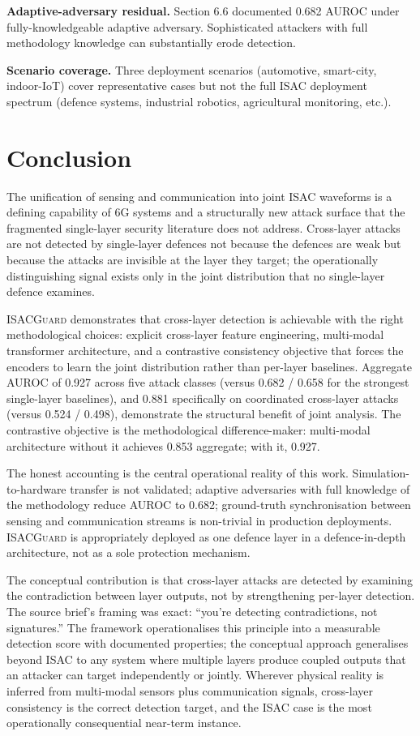 \documentclass[sigconf,nonacm]{acmart}
\begin{document}
\textbf{Adaptive-adversary residual.} Section 6.6 documented
0.682 AUROC under fully-knowledgeable adaptive adversary.
Sophisticated attackers with full methodology knowledge can
substantially erode detection.

\textbf{Scenario coverage.} Three deployment scenarios (automotive,
smart-city, indoor-IoT) cover representative cases but not the
full ISAC deployment spectrum (defence systems, industrial
robotics, agricultural monitoring, etc.).

\section{Conclusion}

The unification of sensing and communication into joint ISAC
waveforms is a defining capability of 6G systems and a
structurally new attack surface that the fragmented
single-layer security literature does not address. Cross-layer
attacks are not detected by single-layer defences not because
the defences are weak but because the attacks are invisible at
the layer they target; the operationally distinguishing signal
exists only in the joint distribution that no single-layer
defence examines.

\textsc{ISACGuard} demonstrates that cross-layer detection is
achievable with the right methodological choices: explicit
cross-layer feature engineering, multi-modal transformer
architecture, and a contrastive consistency objective that
forces the encoders to learn the joint distribution rather than
per-layer baselines. Aggregate AUROC of 0.927 across five attack
classes (versus 0.682 / 0.658 for the strongest single-layer
baselines), and 0.881 specifically on coordinated cross-layer
attacks (versus 0.524 / 0.498), demonstrate the structural
benefit of joint analysis. The contrastive objective is the
methodological difference-maker: multi-modal architecture
without it achieves 0.853 aggregate; with it, 0.927.

The honest accounting is the central operational reality of
this work. Simulation-to-hardware transfer is not validated;
adaptive adversaries with full knowledge of the methodology
reduce AUROC to 0.682; ground-truth synchronisation between
sensing and communication streams is non-trivial in production
deployments. \textsc{ISACGuard} is appropriately deployed as
one defence layer in a defence-in-depth architecture, not as a
sole protection mechanism.

The conceptual contribution is that cross-layer attacks are
detected by examining the contradiction between layer outputs,
not by strengthening per-layer detection. The source brief's
framing was exact: ``you're detecting contradictions, not
signatures.'' The framework operationalises this principle into
a measurable detection score with documented properties; the
conceptual approach generalises beyond ISAC to any system where
multiple layers produce coupled outputs that an attacker can
target independently or jointly. Wherever physical reality is
inferred from multi-modal sensors plus communication signals,
cross-layer consistency is the correct detection target, and
the ISAC case is the most operationally consequential
near-term instance.
\end{document}
